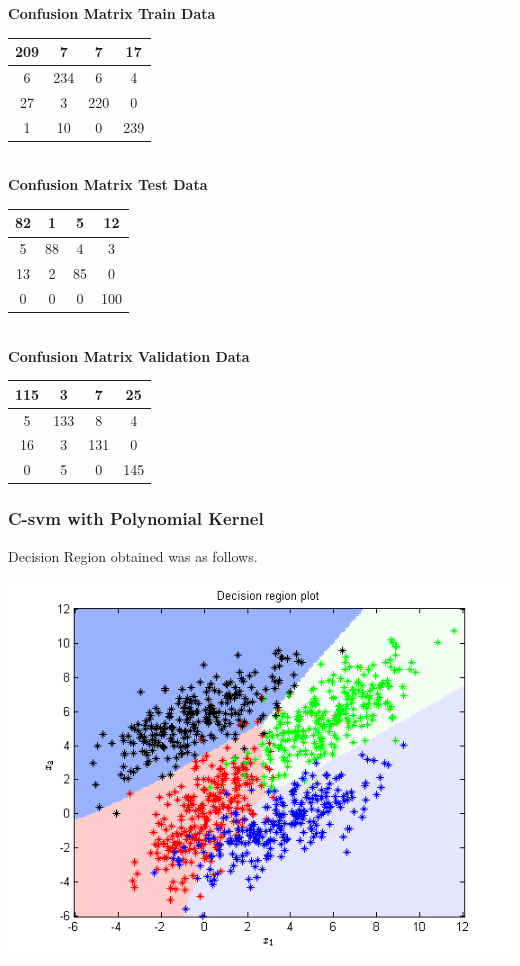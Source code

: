\documentclass{article}
\begin{document}
\begin{flushleft}
\textbf{Confusion Matrix Train Data\\[5pt]}
\begin{tabular}{|c|c|c|c|}
\hline
209 & 7 & 7 & 17 \\
\hline
6 & 234 & 6 & 4 \\
\hline
27 & 3 & 220 & 0 \\
\hline
1 & 10 & 0 & 239 \\
\hline
\end{tabular}
\textbf{\\[10pt] Confusion Matrix Test Data \\[5pt]}
\begin{tabular}{|c|c|c|c|}
\hline
82 & 1 & 5 & 12 \\
\hline
5 & 88 & 4 & 3 \\
\hline
13 & 2 & 85 & 0 \\
\hline
0 & 0 & 0 & 100 \\
\hline
\end{tabular}
\textbf{\\[10pt] Confusion Matrix Validation Data \\[5pt]}
\begin{tabular}{|c|c|c|c|}
\hline
115 & 3 & 7 & 25 \\
\hline
5 & 133 & 8 & 4 \\
\hline
16 & 3 & 131 & 0 \\
\hline
0 & 5 & 0 & 145 \\
\hline
\end{tabular}
\end{flushleft}

\subsubsection{C-svm with Polynomial Kernel}

Decision Region obtained was as follows.
\begin{center}
\includegraphics[scale=1]{Classification/1c/c_poly/dec}
\end{center}
\end{document}
